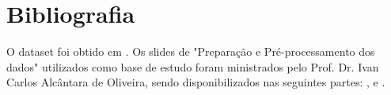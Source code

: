 \documentclass[12pt]{article}
\begin{document}
\section{Bibliografia}

O dataset foi obtido em \cite{topcu2024top1500}.
Os slides de "Preparação e Pré-processamento dos dados" utilizados como base de 
estudo foram ministrados pelo Prof. Dr. Ivan Carlos Alcântara de Oliveira, sendo 
disponibilizados nas seguintes partes: 
\cite{professor_slides_2024parte1}, \cite{professor_slides_2024parte2} e 
\cite{professor_slides_2024parte3}.



\end{document}
